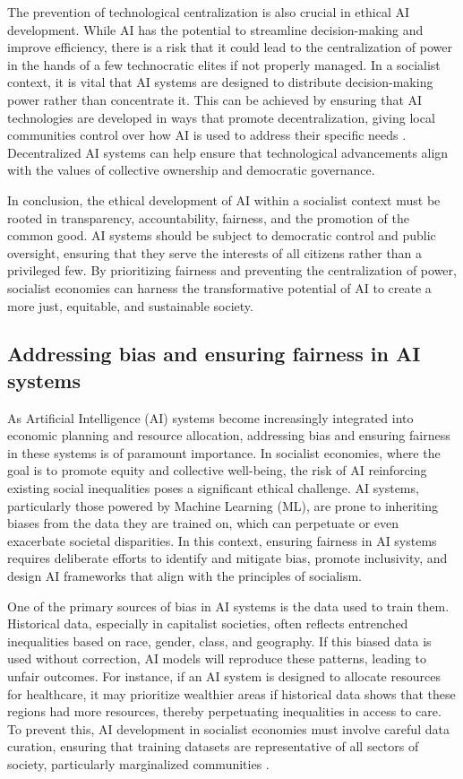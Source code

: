 \begin{refsection}
The prevention of technological centralization is also crucial in ethical AI development. While AI has the potential to streamline decision-making and improve efficiency, there is a risk that it could lead to the centralization of power in the hands of a few technocratic elites if not properly managed. In a socialist context, it is vital that AI systems are designed to distribute decision-making power rather than concentrate it. This can be achieved by ensuring that AI technologies are developed in ways that promote decentralization, giving local communities control over how AI is used to address their specific needs \cite[pp.~98-101]{schneider2018}. Decentralized AI systems can help ensure that technological advancements align with the values of collective ownership and democratic governance.

In conclusion, the ethical development of AI within a socialist context must be rooted in transparency, accountability, fairness, and the promotion of the common good. AI systems should be subject to democratic control and public oversight, ensuring that they serve the interests of all citizens rather than a privileged few. By prioritizing fairness and preventing the centralization of power, socialist economies can harness the transformative potential of AI to create a more just, equitable, and sustainable society.

\subsection{Addressing bias and ensuring fairness in AI systems}

As Artificial Intelligence (AI) systems become increasingly integrated into economic planning and resource allocation, addressing bias and ensuring fairness in these systems is of paramount importance. In socialist economies, where the goal is to promote equity and collective well-being, the risk of AI reinforcing existing social inequalities poses a significant ethical challenge. AI systems, particularly those powered by Machine Learning (ML), are prone to inheriting biases from the data they are trained on, which can perpetuate or even exacerbate societal disparities. In this context, ensuring fairness in AI systems requires deliberate efforts to identify and mitigate bias, promote inclusivity, and design AI frameworks that align with the principles of socialism.

One of the primary sources of bias in AI systems is the data used to train them. Historical data, especially in capitalist societies, often reflects entrenched inequalities based on race, gender, class, and geography. If this biased data is used without correction, AI models will reproduce these patterns, leading to unfair outcomes. For instance, if an AI system is designed to allocate resources for healthcare, it may prioritize wealthier areas if historical data shows that these regions had more resources, thereby perpetuating inequalities in access to care. To prevent this, AI development in socialist economies must involve careful data curation, ensuring that training datasets are representative of all sectors of society, particularly marginalized communities \cite[pp.~78-81]{mazzucato2023}.


\end{refsection}

